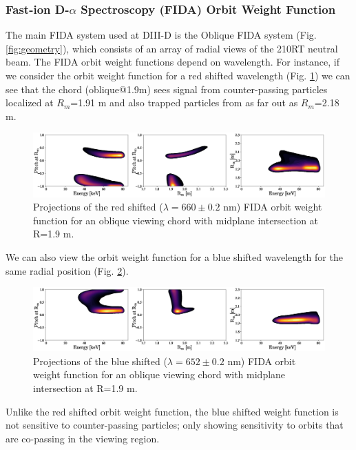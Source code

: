 \subsubsection{Fast-ion D-$\alpha$ Spectroscopy (FIDA) Orbit Weight Function}
The main FIDA system used at DIII-D is the Oblique FIDA system (Fig. \ref{fig:geometry}), which consists of an array of radial views of the 210RT neutral beam.
The FIDA orbit weight functions depend on wavelength.
For instance, if we consider the orbit weight function for a red shifted wavelength (Fig. \ref{fig:fida_red}) we can see that the chord (oblique@1.9m) sees signal from counter-passing particles localized at $R_m$=1.91 m and also trapped particles from as far out as $R_m$=2.18 m. 
\begin{figure}[h!]
    \centering
    \includegraphics[width=15cm]{figures/fida_orbit_weight_red_14.eps}
    \caption{Projections of the red shifted ($\lambda = 660 \pm 0.2$ nm) FIDA orbit weight function for an oblique viewing chord with midplane intersection at R=1.9 m.}
    \label{fig:fida_red}
\end{figure}

We can also view the orbit weight function for a blue shifted wavelength for the same radial position (Fig. \ref{fig:fida_blue}). 
\begin{figure}[h!]
    \centering
    \includegraphics[width=15cm]{figures/fida_orbit_weight_blue_14.eps}
    \caption{Projections of the blue shifted ($\lambda = 652 \pm 0.2$ nm) FIDA orbit weight function for an oblique viewing chord with midplane intersection at R=1.9 m.}
    \label{fig:fida_blue}
\end{figure}
Unlike the red shifted orbit weight function, the blue shifted weight function is not sensitive to counter-passing particles; only showing sensitivity to orbits that are co-passing in the viewing region.

